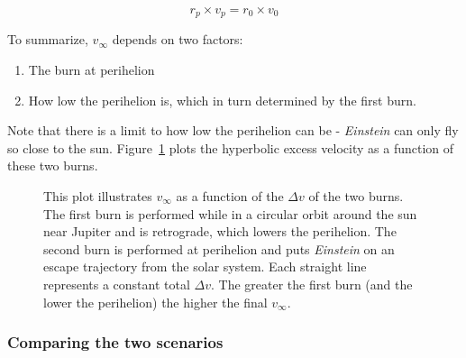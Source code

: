 \documentclass[12pt]{article} %
\begin{document}
$$r_p \times v_p = r_0 \times v_0$$

To summarize, $v_{\infty}$ depends on two factors: 

\begin{enumerate}
\item The burn at perihelion
\item How low the perihelion is, which in turn determined by the first burn. 
\end{enumerate}

Note that there is a limit to how low the perihelion can be - \textit{Einstein} can only fly so close to the sun. Figure~\ref{fig:TwoBurns} plots the hyperbolic excess velocity as a function of these two burns.

\begin{figure}[H]
\caption{This plot illustrates $v_{\infty}$ as a function of the $\Delta v$ of the two burns. The first burn is performed while in a circular orbit around the sun near Jupiter and is retrograde, which lowers the perihelion. The second burn is performed at perihelion and puts \textit{Einstein} on an escape trajectory from the solar system. Each straight line represents a constant total $\Delta v$. The greater the first burn (and the lower the perihelion) the higher the final $v_{\infty}$.}
\label{fig:TwoBurns}
\end{figure}

\subsubsection{Comparing the two scenarios}
\end{document}
